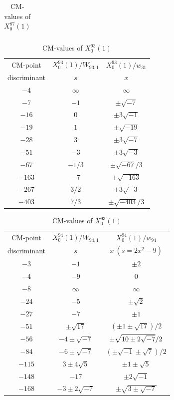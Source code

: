 \documentclass{amsart}
\theoremstyle{definition}
\begin{document}
\begin{appendices}
\begin{table}
\begin{tabular}{|c|c|c|}
\end{tabular}
\bigskip
\caption{CM-values of $X^{87}_0(1)$}
\end{table}

\renewcommand{\arraystretch}{1.5}
\tabcolsep=10pt                         
\begin{table}
\begin{tabular}{|c|c|c|}
\hline
CM-point& ${X_{0}^{93}(1)/W_{93,1}}$ & ${X_{0}^{93}(1)/w_{31}}$ \\ 
        discriminant  & $s$ & $x$  \\ \hline
${-4}$ & $\infty $ & $\infty $ \\ 
${-7}$ & $-1$ & $\pm\sqrt{-7}$   \\ 
${-16}$ & $0$ & $\pm3\sqrt{-1}$  \\ 
${-19}$ & $1$ & $\pm\sqrt{-19}$ \\ 
${-28}$ & $3$ & $\pm3\sqrt{-7}$ \\ 
${-51}$ & $-3$ & $\pm3\sqrt{-3}$  \\ 
${-67}$ & $-{1}/{3}$ & $\pm\sqrt{-67}/3$ \\ 

${-163}$ & $-7$ & $\pm\sqrt{-163}$ \\ 
${-267}$ & ${3}/{2}$ & $\pm3\sqrt{-3}$ \\ 
${-403}$ & ${7}/{3}$ & $\pm\sqrt{-403}/3$ \\ \hline


\end{tabular}
\bigskip
\caption{CM-values of $X^{93}_0(1)$}












\renewcommand{\arraystretch}{1.5}
\tabcolsep=10pt                         
\begin{tabular}{|c|c|c|}
\hline
CM-point& ${X_{0}^{94}(1)/W_{94,1}}$ & ${X_{0}^{94}(1)/w_{94}}$ \\ 
         discriminant & $s$ & $x\ (s=2x^2-9)$   \\ \hline
${-3}$ & $-1$ & $\pm 2$   \\ 
${-4}$ & $-9$ & $0$  \\
${-8}$ & $\infty $ & $\infty $ \\ 
${-24}$ & $-5$ & $\pm \sqrt{2}$   \\ 
${-27}$ & $-7$ & $\pm 1$   \\ 
${-51}$ & $\pm\sqrt{17}$ & $(\pm 1\pm \sqrt{17})/{2}$ 
\\ 
${-56}$ & $-4\pm\sqrt{-7}$ & ${\pm \sqrt{10\pm 2\sqrt{-7}}}/{%
2}$  \\ 
${-84}$ & $-6\pm\sqrt{-7}$ & $(\pm\sqrt{-1}\pm\sqrt{7})/{2}$   \\ 
${-115}$ & $3\pm 4\sqrt{5}$ & $\pm 1\pm \sqrt{5}$   \\ 
${-148}$ & $-17$ & $\pm 2\sqrt{-1}$  \\ 
${-168}$ & $-3\pm2\sqrt{-7}$ & $\pm \sqrt{3\pm \sqrt{-7}}$  \\ 


\end{tabular}
\end{table}
\end{appendices}
\end{document}
